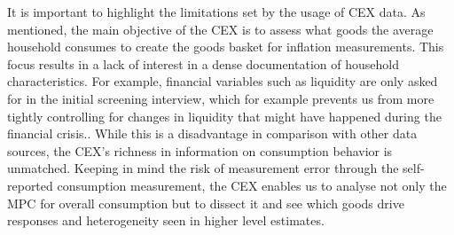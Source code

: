 It is important to highlight the limitations set by the usage of CEX data. As mentioned, the main objective of the CEX is to assess what goods the average household consumes to create the goods basket for inflation measurements. This focus results in a lack of interest in a dense documentation of household characteristics. For example, financial variables such as liquidity are only asked for in the initial screening interview, which for example prevents us from more tightly controlling for changes in liquidity that might have happened during the financial crisis.. While this is a disadvantage in comparison with other data sources, the CEX's richness in information on consumption behavior is unmatched. Keeping in mind the risk of measurement error through the self-reported consumption measurement, the CEX enables us to analyse not only the MPC for overall consumption but to dissect it and see which goods drive responses and heterogeneity seen in higher level estimates.